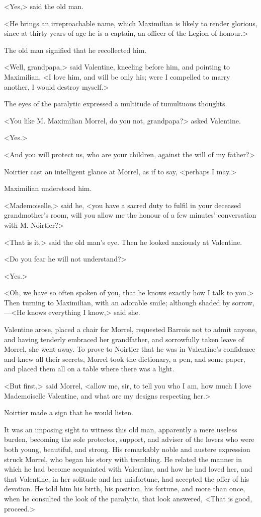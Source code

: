  <Yes,> said the old man. 

 <He brings an irreproachable name, which Maximilian is likely to render glorious, since at thirty years of age he is a captain, an officer of the Legion of honour.> 

 The old man signified that he recollected him. 

 <Well, grandpapa,> said Valentine, kneeling before him, and pointing to Maximilian, <I love him, and will be only his; were I compelled to marry another, I would destroy myself.> 

 The eyes of the paralytic expressed a multitude of tumultuous thoughts. 

 <You like M. Maximilian Morrel, do you not, grandpapa?> asked Valentine. 

 <Yes.> 

 <And you will protect us, who are your children, against the will of my father?> 

 Noirtier cast an intelligent glance at Morrel, as if to say, <perhaps I may.> 

 Maximilian understood him. 

 <Mademoiselle,> said he, <you have a sacred duty to fulfil in your deceased grandmother's room, will you allow me the honour of a few minutes' conversation with M. Noirtier?> 

 <That is it,> said the old man's eye. Then he looked anxiously at Valentine. 

 <Do you fear he will not understand?> 

 <Yes.> 

 <Oh, we have so often spoken of you, that he knows exactly how I talk to you.> Then turning to Maximilian, with an adorable smile; although shaded by sorrow,—<He knows everything I know,> said she. 

 Valentine arose, placed a chair for Morrel, requested Barrois not to admit anyone, and having tenderly embraced her grandfather, and sorrowfully taken leave of Morrel, she went away. To prove to Noirtier that he was in Valentine's confidence and knew all their secrets, Morrel took the dictionary, a pen, and some paper, and placed them all on a table where there was a light. 

 <But first,> said Morrel, <allow me, sir, to tell you who I am, how much I love Mademoiselle Valentine, and what are my designs respecting her.> 

 Noirtier made a sign that he would listen. 

 It was an imposing sight to witness this old man, apparently a mere useless burden, becoming the sole protector, support, and adviser of the lovers who were both young, beautiful, and strong. His remarkably noble and austere expression struck Morrel, who began his story with trembling. He related the manner in which he had become acquainted with Valentine, and how he had loved her, and that Valentine, in her solitude and her misfortune, had accepted the offer of his devotion. He told him his birth, his position, his fortune, and more than once, when he consulted the look of the paralytic, that look answered, <That is good, proceed.> 

